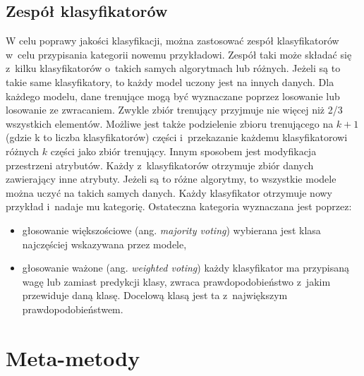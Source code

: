   	
\subsection{Zespół klasyfikatorów}
W celu poprawy jakości klasyfikacji, można zastosować zespół klasyfikatorów w~celu przypisania kategorii nowemu przykładowi. Zespół taki może składać się z~kilku klasyfikatorów o~takich samych algorytmach lub różnych. Jeżeli są to takie same klasyfikatory, to każdy model uczony jest na innych danych. Dla każdego modelu, dane trenujące mogą być wyznaczane poprzez losowanie lub losowanie ze zwracaniem. Zwykle zbiór trenujący przyjmuje nie więcej niż 2/3 wszystkich elementów. Możliwe jest także podzielenie zbioru trenującego na $k+1$ (gdzie k to liczba klasyfikatorów) części i~przekazanie każdemu klasyfikatorowi różnych $k$ części jako zbiór trenujący. Innym sposobem jest modyfikacja przestrzeni atrybutów. Każdy z~klasyfikatorów otrzymuje zbiór danych zawierający inne atrybuty. Jeżeli są to różne algorytmy, to wszystkie modele można uczyć na takich samych danych. Każdy klasyfikator otrzymuje nowy przykład i~nadaje mu kategorię. Ostateczna kategoria wyznaczana jest poprzez:
\begin{itemize}
	\item głosowanie większościowe (ang. \textit{majority voting}) wybierana jest klasa najczęściej wskazywana przez modele,
	\item głosowanie ważone (ang. \textit{weighted voting}) każdy klasyfikator ma przypisaną wagę lub zamiast predykcji klasy, zwraca prawdopodobieństwo z~jakim przewiduje daną klasę. Docelową klasą jest ta z~największym prawdopodobieństwem.
\end{itemize} 
\section{Meta-metody}

